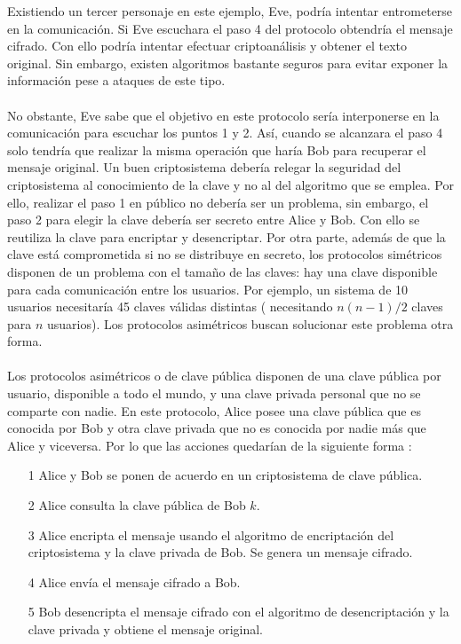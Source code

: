 \documentclass[../PFC.tex]{subfiles}
\begin{document}
Existiendo un tercer personaje en este ejemplo, Eve, podría intentar entrometerse en la comunicación. Si Eve escuchara el paso 4 del protocolo obtendría el mensaje cifrado. Con ello podría intentar efectuar criptoanálisis y obtener el texto original. Sin embargo, existen algoritmos bastante seguros para evitar exponer la información pese a ataques de este tipo.
\\\\
No obstante, Eve sabe que el objetivo en este protocolo sería interponerse en la comunicación para escuchar los puntos 1 y 2. Así, cuando se alcanzara el paso 4 solo tendría que realizar la misma operación que haría Bob para recuperar el mensaje original. Un buen criptosistema debería relegar la seguridad del criptosistema al conocimiento de la clave y no al del algoritmo que se emplea. Por ello, realizar el paso 1 en público no debería ser un problema, sin embargo, el paso 2 para elegir la clave debería ser secreto entre Alice y Bob. Con ello se reutiliza la clave para encriptar y desencriptar. Por otra parte, además de que la clave está comprometida si no se distribuye en secreto, los protocolos simétricos disponen de un problema con el tamaño de las claves: hay una clave disponible para cada comunicación entre los usuarios. Por ejemplo, un sistema de 10 usuarios necesitaría 45 claves válidas distintas ( necesitando $n(n-1)/2$ claves para $n$ usuarios).
Los protocolos asimétricos buscan solucionar este problema otra forma.
\\\\
Los protocolos asimétricos o de clave pública disponen de una clave pública por usuario, disponible a todo el mundo, y una clave privada personal que no se comparte con nadie. En este protocolo, Alice posee una clave pública que es conocida por Bob y otra clave privada que no es conocida por nadie más que Alice y viceversa. Por lo que las acciones quedarían de la siguiente forma :

\begin{itemize}
\item[1]{Alice y Bob se ponen de acuerdo en un criptosistema de clave pública.}
\item[2]{Alice consulta la clave pública de Bob $k$.}
\item[3]{Alice encripta el mensaje usando el algoritmo de encriptación del criptosistema y la clave privada de Bob. Se genera un mensaje cifrado.}
\item[4]{Alice envía el mensaje cifrado a Bob.}
\item[5]{Bob desencripta el mensaje cifrado con el algoritmo de desencriptación y la clave privada y obtiene el mensaje original.}
\end{itemize}
\end{document}
